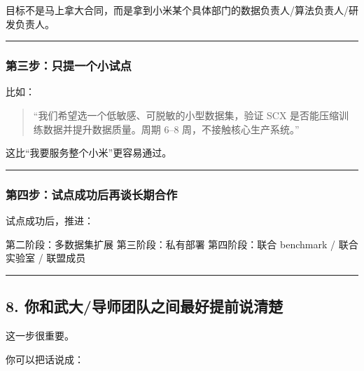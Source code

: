 \documentclass[
  12pt,
]{ctexart}
\newenvironment{Shaded}{}{}
\newcommand{\NormalTok}[1]{#1}
\begin{document}
目标不是马上拿大合同，而是拿到小米某个具体部门的数据负责人/算法负责人/研发负责人。

\begin{center}\rule{0.5\linewidth}{0.5pt}\end{center}

\subsubsection{第三步：只提一个小试点}\label{ux7b2cux4e09ux6b65ux53eaux63d0ux4e00ux4e2aux5c0fux8bd5ux70b9}

比如：

\begin{quote}
``我们希望选一个低敏感、可脱敏的小型数据集，验证 SCX
是否能压缩训练数据并提升数据质量。周期 6--8 周，不接触核心生产系统。''
\end{quote}

这比``我要服务整个小米''更容易通过。

\begin{center}\rule{0.5\linewidth}{0.5pt}\end{center}

\subsubsection{第四步：试点成功后再谈长期合作}\label{ux7b2cux56dbux6b65ux8bd5ux70b9ux6210ux529fux540eux518dux8c08ux957fux671fux5408ux4f5c}

试点成功后，推进：

\begin{Shaded}
\begin{Highlighting}[]
\NormalTok{第二阶段：多数据集扩展}
\NormalTok{第三阶段：私有部署}
\NormalTok{第四阶段：联合 benchmark / 联合实验室 / 联盟成员}
\end{Highlighting}
\end{Shaded}

\begin{center}\rule{0.5\linewidth}{0.5pt}\end{center}

\subsection{8.
你和武大/导师团队之间最好提前说清楚}\label{ux4f60ux548cux6b66ux5927ux5bfcux5e08ux56e2ux961fux4e4bux95f4ux6700ux597dux63d0ux524dux8bf4ux6e05ux695a}

这一步很重要。

你可以把话说成：
\end{document}
